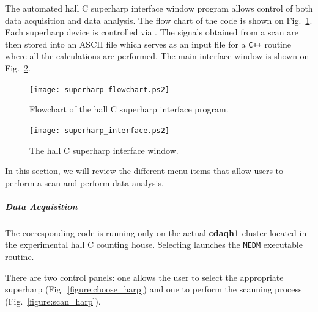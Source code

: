 The automated hall C superharp interface window program allows control of both
data acquisition and data analysis. The flow chart of the code is shown on Fig.~\ref{figure:flow_chart}. 
Each superharp device is controlled via 
. The
signals obtained from a scan are then
stored into an ASCII file which serves as an input file for a {\tt C++} routine where all the
calculations are performed. The main interface window is shown on Fig.~\ref{figure:interface}.

\begin{figure}[!hbt]
\begin{center}
\texttt{[image: superharp-flowchart.ps2]}
\caption{Flowchart of the hall C superharp interface program.}\label{figure:flow_chart}
\end{center}
\end{figure}

\begin{figure}[!hbt]
\begin{center}
\texttt{[image: superharp\_interface.ps2]}
\caption{The hall C superharp interface window.}\label{figure:interface}
\end{center}
\end{figure}

In this section, we will review the different menu items that allow users to perform a scan and
perform data analysis.

	\subparagraph{Data Acquisition}\label{daq}

The corresponding code is running only on the actual {\bf cdaqh1} cluster located in the experimental
hall C counting house. Selecting {\bf{}} launches the {\tt MEDM} executable routine.

There are two control panels: one allows the user to select the appropriate superharp
(Fig.~\ref{figure:choose_harp}) and one to perform the scanning process (Fig.~\ref{figure:scan_harp}).

